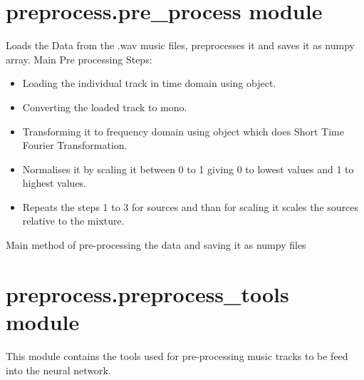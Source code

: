 \documentclass[letterpaper,10pt,english]{sphinxmanual}
\begin{document}
\section{preprocess.pre\_process module}
\label{\detokenize{docs/source/preprocess:module-preprocess.pre_process}}\label{\detokenize{docs/source/preprocess:preprocess-pre-process-module}}
Loads the Data from the .wav music files, preprocesses it and saves it as numpy array.
Main Pre processing Steps:
\begin{itemize}
\item {} 
Loading the individual track in time domain using  object.

\item {} 
Converting the loaded track to mono.

\item {} 
Transforming it to frequency domain using  object which does Short Time Fourier Transformation.

\item {} 
Normalises it by scaling it between 0 to 1 giving 0 to lowest values and 1 to highest values.

\item {} 
Repeats the steps 1 to 3 for sources and than for scaling it scales the sources relative to the mixture.

\end{itemize}

\begin{fulllineitems}
\label{\detokenize{docs/source/preprocess:preprocess.pre_process.main}}
Main method of pre-processing the data and saving it as numpy files

\end{fulllineitems}



\section{preprocess.preprocess\_tools module}
\label{\detokenize{docs/source/preprocess:module-preprocess.preprocess_tools}}\label{\detokenize{docs/source/preprocess:preprocess-preprocess-tools-module}}
This module contains the tools used for pre-processing music tracks to be feed into the neural network.
\end{document}
